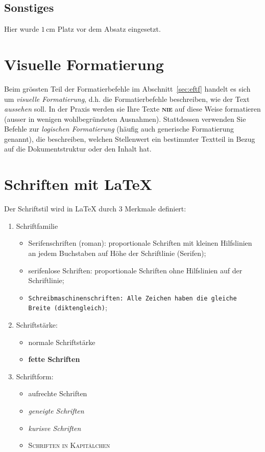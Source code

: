\documentclass[11pt, a4paper,draft]{article}
\newcommand{\ltx}{\LaTeX}
\begin{document}
\vspace{1cm}
\subsection{Sonstiges} 
Hier wurde $1$\,cm  Platz vor dem Absatz eingesetzt. 
\endgroup
\endgroup

\section{Visuelle Formatierung}
Beim grössten Teil der Formatierbefehle im Abschnitt~\ref{sec:eftf}  handelt es sich um \textit{visuelle Formatierung}, d.h. die Formatierbefehle beschreiben, wie der Text \textit{aussehen} soll. In der Praxis werden sie Ihre Texte \textsc{\textbf{nie}} auf diese Weise formatieren (ausser in wenigen wohlbegründeten Ausnahmen).
Stattdessen verwenden Sie Befehle zur \textit{logischen Formatierung} (häufig auch generische Formatierung genannt), die beschreiben, welchen Stellenwert ein bestimmter Textteil in Bezug auf die Dokumentstruktur oder den Inhalt hat.

\section{Schriften mit \ltx}

Der Schriftstil wird in \ltx{} durch 3 Merkmale definiert:

\begin{enumerate}
\item Schriftfamilie
\begin{itemize}
\item Serifenschriften (roman): proportionale Schriften mit kleinen Hilfslinien an jedem Buchstaben auf H\"ohe der Schriftlinie (Serifen);
\item \textsf{serifenlose Schriften: proportionale Schriften ohne Hilfslinien auf der Schriftlinie};
\item \texttt{Schreibmaschinenschriften: Alle Zeichen haben die gleiche Breite (diktengleich)};
\end{itemize}
\item Schriftst\"arke:
\begin{itemize}
\item normale Schriftstärke
\item \textbf{fette Schriften}
\end{itemize}
\item Schriftform:
\begin{itemize}
\item aufrechte Schriften
\item \textsl{geneigte Schriften}
\item \textit{kurisve Schriften}
\item \textsc{Schriften in Kapitälchen}
\end{itemize}
\end{enumerate}
\end{document}
